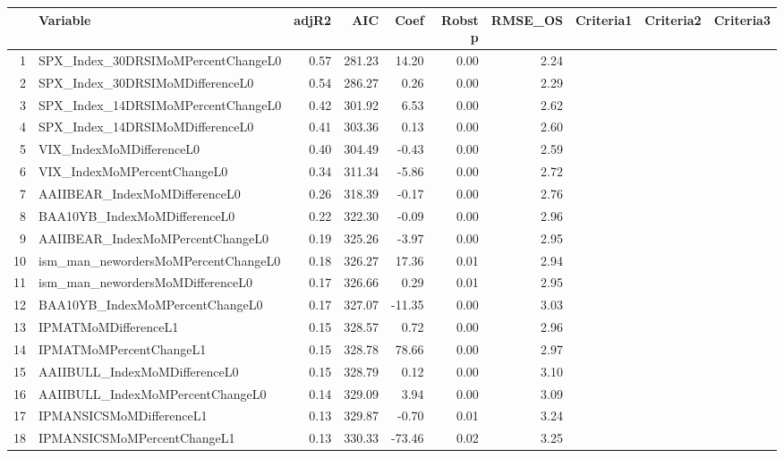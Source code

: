 \begin{longtable}{rlrrrrrlll}
  \hline
 & Variable & adjR2 & AIC & Coef & Robst p & RMSE\_OS & Criteria1 & Criteria2 & Criteria3 \\ 
  \hline
1 & SPX\_Index\_30DRSIMoMPercentChangeL0 & 0.57 & 281.23 & 14.20 & 0.00 & 2.24 &  &  &  \\ 
  2 & SPX\_Index\_30DRSIMoMDifferenceL0 & 0.54 & 286.27 & 0.26 & 0.00 & 2.29 &  &  &  \\ 
  3 & SPX\_Index\_14DRSIMoMPercentChangeL0 & 0.42 & 301.92 & 6.53 & 0.00 & 2.62 &  &  &  \\ 
  4 & SPX\_Index\_14DRSIMoMDifferenceL0 & 0.41 & 303.36 & 0.13 & 0.00 & 2.60 &  &  &  \\ 
  5 & VIX\_IndexMoMDifferenceL0 & 0.40 & 304.49 & -0.43 & 0.00 & 2.59 &  &  &  \\ 
  6 & VIX\_IndexMoMPercentChangeL0 & 0.34 & 311.34 & -5.86 & 0.00 & 2.72 &  &  &  \\ 
  7 & AAIIBEAR\_IndexMoMDifferenceL0 & 0.26 & 318.39 & -0.17 & 0.00 & 2.76 &  &  &  \\ 
  8 & BAA10YB\_IndexMoMDifferenceL0 & 0.22 & 322.30 & -0.09 & 0.00 & 2.96 &  &  &  \\ 
  9 & AAIIBEAR\_IndexMoMPercentChangeL0 & 0.19 & 325.26 & -3.97 & 0.00 & 2.95 &  &  &  \\ 
  10 & ism\_man\_newordersMoMPercentChangeL0 & 0.18 & 326.27 & 17.36 & 0.01 & 2.94 &  &  &  \\ 
  11 & ism\_man\_newordersMoMDifferenceL0 & 0.17 & 326.66 & 0.29 & 0.01 & 2.95 &  &  &  \\ 
  12 & BAA10YB\_IndexMoMPercentChangeL0 & 0.17 & 327.07 & -11.35 & 0.00 & 3.03 &  &  &  \\ 
  13 & IPMATMoMDifferenceL1 & 0.15 & 328.57 & 0.72 & 0.00 & 2.96 &  &  &  \\ 
  14 & IPMATMoMPercentChangeL1 & 0.15 & 328.78 & 78.66 & 0.00 & 2.97 &  &  &  \\ 
  15 & AAIIBULL\_IndexMoMDifferenceL0 & 0.15 & 328.79 & 0.12 & 0.00 & 3.10 &  &  &  \\ 
  16 & AAIIBULL\_IndexMoMPercentChangeL0 & 0.14 & 329.09 & 3.94 & 0.00 & 3.09 &  &  &  \\ 
  17 & IPMANSICSMoMDifferenceL1 & 0.13 & 329.87 & -0.70 & 0.01 & 3.24 &  &  &  \\ 
  18 & IPMANSICSMoMPercentChangeL1 & 0.13 & 330.33 & -73.46 & 0.02 & 3.25 &  &  &  \\ 

\end{longtable}
